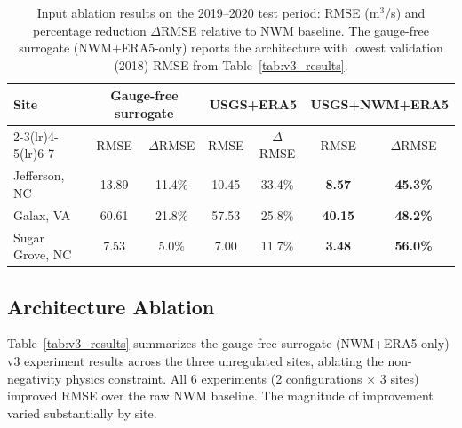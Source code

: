 \documentclass[draft]{agujournal2019}
\begin{document}
\begin{table}
    \centering
    \caption{Input ablation results on the 2019--2020 test period: RMSE (m$^3$/s) and percentage reduction $\Delta$RMSE relative to NWM baseline. The gauge-free surrogate (NWM+ERA5-only) reports the architecture with lowest validation (2018) RMSE from Table~\ref{tab:v3_results}.}
    \small
    \begin{tabular}{l cc cc cc}
        \toprule
        \textbf{Site} & \multicolumn{2}{c}{\textbf{Gauge-free surrogate}} & \multicolumn{2}{c}{\textbf{USGS+ERA5}} & \multicolumn{2}{c}{\textbf{USGS+NWM+ERA5}} \\
        \cmidrule(lr){2-3}\cmidrule(lr){4-5}\cmidrule(lr){6-7}
         & RMSE & $\Delta$RMSE & RMSE & $\Delta$RMSE & RMSE & $\Delta$RMSE \\
        \midrule
        Jefferson, NC   & 13.89 & 11.4\% & 10.45 & 33.4\% & \textbf{8.57}  & \textbf{45.3\%} \\
        Galax, VA       & 60.61 & 21.8\% & 57.53 & 25.8\% & \textbf{40.15} & \textbf{48.2\%} \\
        Sugar Grove, NC & 7.53  &  5.0\% & 7.00  & 11.7\% & \textbf{3.48}  & \textbf{56.0\%} \\
        \bottomrule
    \end{tabular}
    \label{tab:input_ablation}
\end{table}

\subsection{Architecture Ablation}

Table~\ref{tab:v3_results} summarizes the gauge-free surrogate (NWM+ERA5-only) v3 experiment results across the three unregulated sites, ablating the non-negativity physics constraint. All 6 experiments (2 configurations $\times$ 3 sites) improved RMSE over the raw NWM baseline. The magnitude of improvement varied substantially by site.
\end{document}

